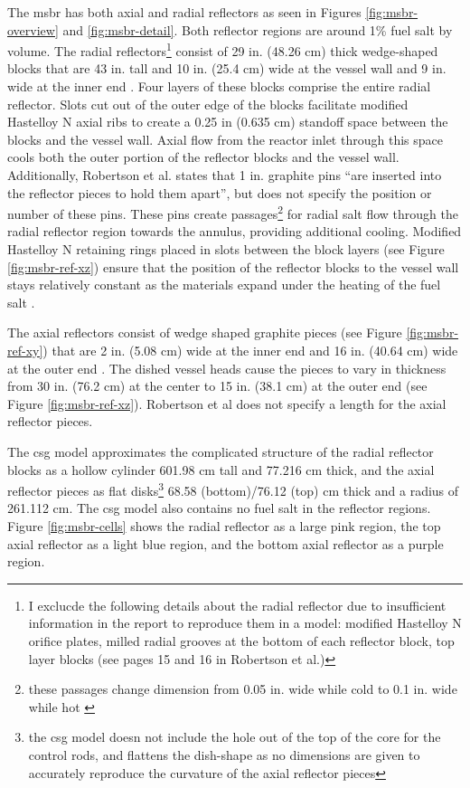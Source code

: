 The \Gls{msbr} has both axial and radial reflectors as seen in Figures
\ref{fig:msbr-overview} and \ref{fig:msbr-detail}. Both reflector regions are around 1\% fuel salt by volume. The radial
reflectors\footnote{I exclucde the following details about the radial reflector
due to insufficient information in the report to reproduce them in a model:
modified Hastelloy N orifice plates, milled radial grooves at the bottom of each
reflector block, top layer blocks (see pages 15 and 16 in Robertson et al.)}
consist of 29 in. (48.26 cm) thick wedge-shaped blocks that are 43 in. tall and 10 in. (25.4 cm) wide at the vessel wall and 9 in. wide at the inner end \cite{robertson_conceptual_1973}.
Four layers of these blocks comprise the entire radial reflector. Slots cut out
of the outer edge of the blocks facilitate modified Hastelloy N axial ribs to create a
0.25 in (0.635 cm) standoff space between the blocks and the vessel wall. Axial
flow from the reactor inlet through this space cools both the outer portion of
the reflector blocks and the vessel wall. Additionally, Robertson et al. states
that 1 in. graphite pins ``are inserted into the reflector pieces to hold them
apart'', but does not specify the position or number of these pins. These pins
create passages\footnote{these passages change dimension from 0.05 in. wide
while cold to 0.1 in. wide while hot \cite{robertson_conceptual_1971}} for
radial salt flow through the radial reflector region towards the annulus,
providing additional cooling. Modified Hastelloy N retaining rings placed in slots
between the block layers (see Figure \ref{fig:msbr-ref-xz}) ensure that the
position of the reflector blocks to the vessel wall stays relatively constant as
the materials expand under the heating of the fuel salt
\cite{robertson_conceptual_1973}.

The axial reflectors consist of wedge shaped graphite pieces (see Figure
\ref{fig:msbr-ref-xy}) that are 2 in. (5.08 cm) wide at the inner end and 16 in.
(40.64 cm) wide at the outer end \cite{robertson_conceptual_1971}. The dished
vessel heads cause the pieces to vary in thickness from 30 in. (76.2 cm) at the
center to 15 in. (38.1 cm) at the outer end (see Figure
\ref{fig:msbr-ref-xz})\cite{robertson_conceptual_1971}. Robertson et al does not
specify a length for the axial reflector pieces. 

The \Gls{csg} model approximates the complicated structure of the radial
reflector blocks as a hollow cylinder 601.98 cm tall and 77.216 cm thick, and
the axial reflector pieces as flat disks\footnote{the \Gls{csg} model doesn not
include the hole out of the top of the core for the control rods, and flattens
the dish-shape as no dimensions are given to accurately reproduce the curvature
of the axial reflector pieces} 68.58 (bottom)/76.12 (top) cm thick and a radius
of 261.112 cm. The \Gls{csg} model also contains no fuel salt in the reflector
regions. Figure \ref{fig:msbr-cells} shows the radial reflector as a large pink
region, the top axial reflector as a light blue region, and the bottom axial
reflector as a purple region.

